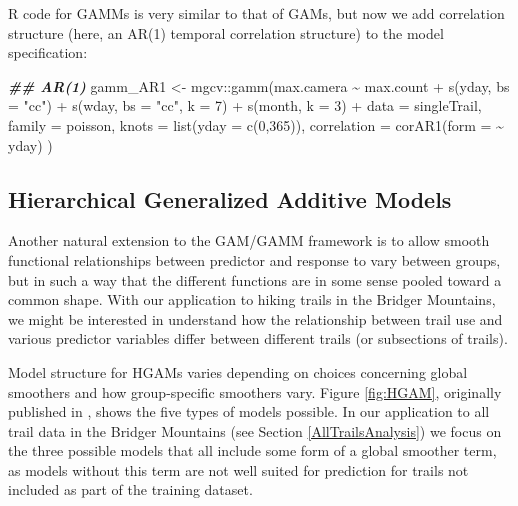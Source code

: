 \documentclass[
]{book}
\newenvironment{Shaded}{\begin{snugshade}}{\end{snugshade}}
\newcommand{\AttributeTok}[1]{\textcolor[rgb]{0.77,0.63,0.00}{#1}}
\newcommand{\DecValTok}[1]{\textcolor[rgb]{0.00,0.00,0.81}{#1}}
\newcommand{\DocumentationTok}[1]{\textcolor[rgb]{0.56,0.35,0.01}{\textbf{\textit{#1}}}}
\newcommand{\FunctionTok}[1]{\textcolor[rgb]{0.00,0.00,0.00}{#1}}
\newcommand{\NormalTok}[1]{#1}
\newcommand{\OtherTok}[1]{\textcolor[rgb]{0.56,0.35,0.01}{#1}}
\newcommand{\SpecialCharTok}[1]{\textcolor[rgb]{0.00,0.00,0.00}{#1}}
\newcommand{\StringTok}[1]{\textcolor[rgb]{0.31,0.60,0.02}{#1}}
\begin{document}
R code for GAMMs is very similar to that of GAMs, but now we add
correlation structure (here, an AR(1) temporal correlation structure) to
the model specification:

\begin{Shaded}
\begin{Highlighting}[]
 \DocumentationTok{\#\# AR(1)}
\NormalTok{gamm\_AR1 }\OtherTok{\textless{}{-}}\NormalTok{ mgcv}\SpecialCharTok{::}\FunctionTok{gamm}\NormalTok{(max.camera }\SpecialCharTok{\textasciitilde{}}\NormalTok{ max.count }\SpecialCharTok{+}
                         \FunctionTok{s}\NormalTok{(yday, }\AttributeTok{bs =} \StringTok{"cc"}\NormalTok{) }\SpecialCharTok{+}
                         \FunctionTok{s}\NormalTok{(wday, }
                           \AttributeTok{bs =} \StringTok{"cc"}\NormalTok{, }\AttributeTok{k =} \DecValTok{7}\NormalTok{) }\SpecialCharTok{+}
                         \FunctionTok{s}\NormalTok{(month, }\AttributeTok{k =} \DecValTok{3}\NormalTok{) }\SpecialCharTok{+}
                         \AttributeTok{data =}\NormalTok{ singleTrail, }
                       \AttributeTok{family =}\NormalTok{ poisson,}
                       \AttributeTok{knots =} \FunctionTok{list}\NormalTok{(}\AttributeTok{yday =} \FunctionTok{c}\NormalTok{(}\DecValTok{0}\NormalTok{,}\DecValTok{365}\NormalTok{)),}
                       \AttributeTok{correlation =} \FunctionTok{corAR1}\NormalTok{(}\AttributeTok{form =} \SpecialCharTok{\textasciitilde{}}\NormalTok{ yday)}
\NormalTok{)}
\end{Highlighting}
\end{Shaded}

\hypertarget{hierarchical-generalized-additive-models}{%
\subsection{Hierarchical Generalized Additive Models}\label{hierarchical-generalized-additive-models}}

Another natural extension to the GAM/GAMM framework is to allow smooth
functional relationships between predictor and response to vary between
groups, but in such a way that the different functions are in some sense
pooled toward a common shape. With our application to hiking trails in
the Bridger Mountains, we might be interested in understand how the
relationship between trail use and various predictor variables differ
between different trails (or subsections of trails).

Model structure for HGAMs varies depending on choices concerning global
smoothers and how group-specific smoothers vary. Figure \ref{fig:HGAM},
originally published in \citet{pedersen2019hierarchical}, shows the five types
of models possible. In our application to all trail data in the Bridger
Mountains (see Section \ref{AllTrailsAnalysis}) we focus on the three
possible models that all include some form of a global smoother term, as
models without this term are not well suited for prediction for trails
not included as part of the training dataset.
\end{document}
